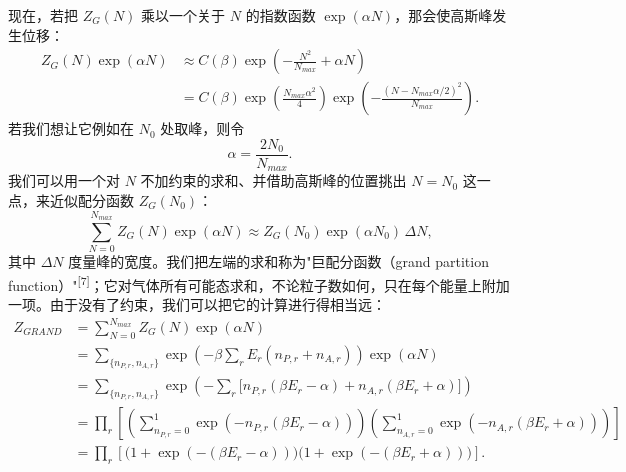 现在，若把 $Z_{G}(N)$ 乘以一个关于 $N$ 的指数函数 $\exp(\alpha N)$，那会使高斯峰发生位移：
\begin{align}
Z_{G}(N)\exp(\alpha N)
&\approx C(\beta)\exp\!\left(-\frac{N^{2}}{N_{max}}+\alpha N\right) \nonumber\\
&=C(\beta)\exp\!\left(\frac{N_{max}\alpha^{2}}{4}\right)
\exp\!\left(-\frac{(N-N_{max}\alpha/2)^{2}}{N_{max}}\right).
\end{align}
若我们想让它例如在 $N_{0}$ 处取峰，则令
\begin{equation}
\alpha=\frac{2N_{0}}{N_{max}}.
\end{equation}
我们可以用一个对 $N$ 不加约束的求和、并借助高斯峰的位置挑出 $N=N_{0}$ 这一点，来近似配分函数 $Z_{G}(N_{0})$：
\begin{equation}
\sum_{N=0}^{N_{max}}Z_{G}(N)\exp(\alpha N)\approx Z_{G}(N_{0})\exp(\alpha N_{0})\,\Delta N,
\end{equation}
其中 $\Delta N$ 度量峰的宽度。我们把左端的求和称为"巨配分函数（grand partition function）"\textsuperscript{[7]}；它对气体所有可能态求和，不论粒子数如何，只在每个能量上附加一项。由于没有了约束，我们可以把它的计算进行得相当远：
\begin{align}
Z_{GRAND}
&=\sum_{N=0}^{N_{max}}Z_{G}(N)\exp(\alpha N) \nonumber\\
&=\sum_{\{n_{P,r},n_{A,r}\}}
\exp\!\left(-\beta\sum_{r}E_{r}(n_{P,r}+n_{A,r})\right)\exp(\alpha N) \nonumber\\
&=\sum_{\{n_{P,r},n_{A,r}\}}
\exp\!\left(-\sum_{r}\bigl[n_{P,r}(\beta E_{r}-\alpha)+n_{A,r}(\beta E_{r}+\alpha)\bigr]\right) \nonumber\\
&=\prod_{r}\left[
\left(\sum_{n_{P,r}=0}^{1}\exp(-n_{P,r}(\beta E_{r}-\alpha))\right)
\left(\sum_{n_{A,r}=0}^{1}\exp(-n_{A,r}(\beta E_{r}+\alpha))\right)\right] \nonumber\\
&=\prod_{r}\left[
\bigl(1+\exp(-(\beta E_{r}-\alpha))\bigr)
\bigl(1+\exp(-(\beta E_{r}+\alpha))\bigr)\right].
\end{align}

